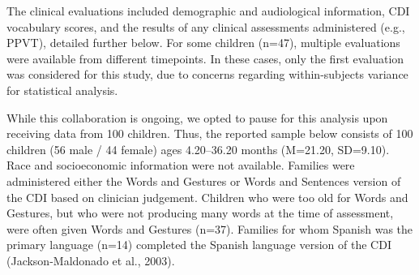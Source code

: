 \documentclass[english,man]{apa6}
\begin{document}
The clinical evaluations included demographic and audiological information, CDI vocabulary scores, and the results of any clinical assessments administered (e.g., PPVT), detailed further below. For some children (n=47), multiple evaluations were available from different timepoints. In these cases, only the first evaluation was considered for this study, due to concerns regarding within-subjects variance for statistical analysis.

While this collaboration is ongoing, we opted to pause for this analysis upon receiving data from 100 children. Thus, the reported sample below consists of 100 children (56 male / 44 female) ages 4.20--36.20 months (M=21.20, SD=9.10). Race and socioeconomic information were not available. Families were administered either the Words and Gestures or Words and Sentences version of the CDI based on clinician judgement. Children who were too old for Words and Gestures, but who were not producing many words at the time of assessment, were often given Words and Gestures (n=37). Families for whom Spanish was the primary language (n=14) completed the Spanish language version of the CDI (Jackson-Maldonado et al., 2003).

\begin{table}

\caption{\label{tab:CDIinfo}CDI details}
\centering
{}
\end{table}
\end{document}
